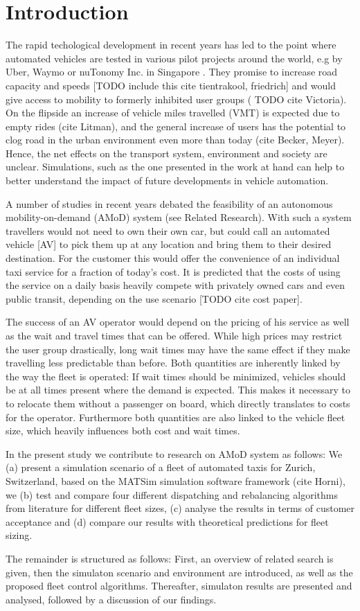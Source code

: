 \section{Introduction}

The rapid techological development in recent years has led to the point where
automated vehicles are tested in various pilot projects around the world, e.g by
Uber, Waymo or nuTonomy Inc. in Singapore \citep{ackerman2017hail}. They promise to increase road
capacity and speeds
[TODO include this cite tientrakool, friedrich] and would give access to mobility to formerly
inhibited user groups ( TODO cite Victoria). On the flipside an increase of vehicle
miles travelled (VMT) is expected due to empty rides (cite Litman), and the general increase
of users has the potential to clog road in the urban environment even more than today (cite Becker, Meyer).
Hence, the net effects on
the transport system, environment and society are unclear. Simulations, such as
the one presented in the work at hand can help to better understand the impact
of future developments in vehicle automation.

A number of studies in recent years debated the feasibility of an autonomous
mobility-on-demand (AMoD) system (see Related Research). With such a system travellers
would not need to own their own car, but could call an automated vehicle [AV] to pick
them up at any location and bring them to their desired destination. For the customer
this would offer the convenience of an individual taxi service
for a fraction of today's cost. It is predicted that the costs of using the
service on a daily basis heavily compete with privately owned cars and even
public transit, depending on the use scenario [TODO cite cost paper].

The success of an AV operator would depend on the pricing of his service
as well as the wait and travel times that can be offered. While high prices
may restrict the user group drastically, long wait times may have the same effect
if they make travelling less predictable than before. Both quantities are inherently
linked by the way the fleet is operated: If wait times should be minimized, vehicles
should be at all times present where the demand is expected. This makes it necessary to to
relocate them without a passenger on board, which directly translates to costs for
the operator. Furthermore both quantities are also linked to the vehicle fleet
size, which heavily influences both cost and wait times.

In the present study we contribute to research on AMoD system as follows: We
(a) present a simulation scenario of a fleet of automated taxis for Zurich, Switzerland,
based on the MATSim simulation software framework (cite Horni), we (b) test and compare four different dispatching and rebalancing algorithms from literature for different fleet sizes, (c) analyse the results
in terms of customer acceptance and (d) compare our results with theoretical
predictions for fleet sizing.

The remainder is structured as follows: First, an overview of related search is
given, then the simulaton scenario and environment are introduced, as well as the
proposed fleet control algorithms. Thereafter, simulaton results are presented and
analysed, followed by a discussion of our findings.
